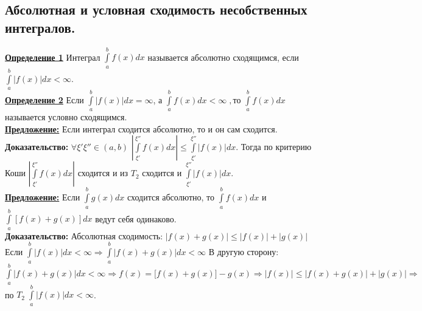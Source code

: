 \documentclass[a4paper,12pt]{article} %
\renewcommand {\leq}{\leqslant}
\begin{document}
\subsection{Абсолютная и условная сходимость несобственных интегралов.}
\underline{\textbf{Определение 1}} Интеграл $\int\limits_{a}^{b} f(x) dx$ называется абсолютно сходящимся, если $\int\limits_{a}^{b} |f(x)| dx < \infty$.\\
\underline{\textbf{Определение 2}} Если $\int\limits_{a}^{b} |f(x)| dx = \infty$, а $\int\limits_{a}^{b} f(x) dx < \infty\;  , то$ $\int\limits_{a}^{b} f(x) dx$ называется условно сходящимся.\\
\underline{\textbf{Предложение:}} Если интеграл сходится абсолютно, то и он сам сходится.\\
\textbf{Доказательство:}
$\forall \xi' \xi'' \in (a, b)$
$ \left|\int\limits_{\xi'}^{\xi''} f(x) dx\right| \leq \int\limits_{\xi'}^{\xi''} |f(x)| dx$. Тогда по критерию Коши
$\left|\int\limits_{\xi'}^{\xi''} f(x) dx\right|$ сходится 
и из $T_2$ сходится и $\int\limits_{\xi'}^{\xi''} |f(x)| dx$.\\
\underline{\textbf{Предложение:}} Если $\int\limits_{a}^{b} g(x) dx$ сходится абсолютно, то $\int\limits_{a}^{b} f(x) dx$ и $\int\limits_{a}^{b} [f(x)+g(x)] dx$ ведут себя одинаково.\\
\textbf{Доказательство:} Абсолютная сходимость:
$|f(x) +g(x)| \leq |f(x)| + |g(x)|$ 
Если $\int\limits_{a}^{b} |f(x)| dx < \infty   \Rightarrow \int\limits_a^b |f(x) +g(x)| dx < \infty$ 
В другую сторону: $\int\limits_a^b |f(x) +g(x)| dx < \infty \Rightarrow f(x) = \bigl[f(x) + g(x) \bigr]-g(x) \Rightarrow |f(x)| \leq |f(x) + g(x)| + |g(x)| \Rightarrow $ по $T_2\; \int\limits_a^b |f(x)| dx < \infty$.\\
\end{document}
